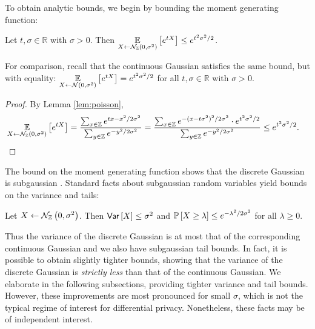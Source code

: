 \documentclass{jpcfinal} %
\newcommand{\dgausss}[2]{{\discN\left(#1,#2\right)}}
\newcommand{\dgauss}[1]{\dgausss{0}{#1}}
\newcommand{\ex}[2]{{\ifx&#1& \mathbb{E} \else
\underset{#1}{\mathbb{E}} \fi \left[#2\right]}}
\newcommand{\pr}[2]{{\ifx&#1& \mathbb{P} \else
\underset{#1}{\mathbb{P}} \fi \left[#2\right]}}
\newcommand{\var}[2]{{\ifx&#1& \mathsf{Var} \else
\underset{#1}{\mathsf{Var}} \fi \left[#2\right]}}
\newcommand{\Z}{\mathbb{Z}}
\newcommand{\R}{\mathbb{R}}
\begin{document}
To obtain analytic bounds, we begin by bounding the moment generating function:
\begin{lem}
Let $t,\sigma\in\R$ with $\sigma>0$. Then $\ex{X \gets \dgauss{\sigma^2}}{e^{tX}}\le e^{t^2\sigma^2/2}$.
\end{lem}
\noindent For comparison, recall that the continuous Gaussian satisfies the same bound, but with equality: $\ex{X \gets \mathcal{N}(0,\sigma^2)}{e^{tX}}=e^{t^2\sigma^2/2}$ for all $t,\sigma\in\R$ with $\sigma>0$.
\begin{proof}
By Lemma \ref{lem:poisson},
\begin{align*}
    \ex{X \gets \dgauss{\sigma^2}}{e^{tX}} &= \frac{\sum_{x \in \Z} e^{tx-x^2/2\sigma^2}}{\sum_{y \in \Z} e^{-y^2/2\sigma^2}} = \frac{\sum_{x \in \Z} e^{-(x-t\sigma^2)^2/2\sigma^2} \cdot e^{t^2\sigma^2/2}}{\sum_{y \in \Z} e^{-y^2/2\sigma^2}} \le e^{t^2\sigma^2/2}.
\end{align*}
\end{proof}
The bound on the moment generating function shows that the discrete Gaussian is subgaussian \citep{Rivasplata12}. Standard facts about subgaussian random variables yield bounds on the variance and tails:
\begin{cor}
\label{cor:bounds}
Let $X \gets \dgauss{\sigma^2}$. Then $\var{}{X}\le \sigma^2$ and $\pr{}{X\ge\lambda} \le e^{-\lambda^2/2\sigma^2}$ for all $\lambda \ge 0$.
\end{cor}
Thus the variance of the discrete Gaussian is at most that of the corresponding continuous Gaussian and we also have subgaussian tail bounds.
In fact, it is possible to obtain slightly tighter bounds, showing that the variance of the discrete Gaussian is \emph{strictly less} than that of the continuous Gaussian. We elaborate in the following subsections, providing tighter variance and tail bounds. However, these improvements are most pronounced for small $\sigma$, which is not the typical regime of interest for differential privacy. Nonetheless, these facts may be of independent interest. 
\end{document}
